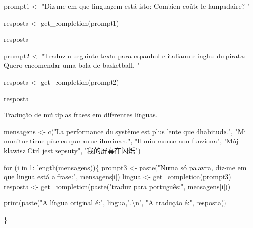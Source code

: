 \documentclass[
  letterpaper,
  paper=6in:9in,
  pagesize=pdftex,
  headinclude=on,
  footinclude=on,
  12pt]{scrbook}
\newenvironment{Shaded}{\begin{snugshade}}{\end{snugshade}}
\newcommand{\ControlFlowTok}[1]{\textcolor[rgb]{0.00,0.23,0.31}{#1}}
\newcommand{\DecValTok}[1]{\textcolor[rgb]{0.68,0.00,0.00}{#1}}
\newcommand{\FunctionTok}[1]{\textcolor[rgb]{0.28,0.35,0.67}{#1}}
\newcommand{\NormalTok}[1]{\textcolor[rgb]{0.00,0.23,0.31}{#1}}
\newcommand{\OtherTok}[1]{\textcolor[rgb]{0.00,0.23,0.31}{#1}}
\newcommand{\SpecialCharTok}[1]{\textcolor[rgb]{0.37,0.37,0.37}{#1}}
\newcommand{\StringTok}[1]{\textcolor[rgb]{0.13,0.47,0.30}{#1}}
\begin{document}
\begin{Shaded}
\begin{Highlighting}[]
\NormalTok{prompt1 }\OtherTok{\textless{}{-}} \StringTok{"Diz{-}me em que linguagem está isto: \textquotesingle{}Combien coûte le lampadaire?\textquotesingle{} "}

\NormalTok{resposta }\OtherTok{\textless{}{-}} \FunctionTok{get\_completion}\NormalTok{(prompt1)}

\NormalTok{resposta}
\end{Highlighting}
\end{Shaded}

\begin{Shaded}
\begin{Highlighting}[]
\NormalTok{prompt2 }\OtherTok{\textless{}{-}} \StringTok{"Traduz o seguinte texto para espanhol e }
\StringTok{italiano e ingles de pirata: \textquotesingle{}\textquotesingle{}\textquotesingle{}Quero encomendar uma bola de basketball.\textquotesingle{}\textquotesingle{}\textquotesingle{} "}

\NormalTok{resposta }\OtherTok{\textless{}{-}} \FunctionTok{get\_completion}\NormalTok{(prompt2)}

\NormalTok{resposta}
\end{Highlighting}
\end{Shaded}

Tradução de múltiplas frases em diferentes línguas.

\begin{Shaded}
\begin{Highlighting}[]
\NormalTok{mensagens }\OtherTok{\textless{}{-}} \FunctionTok{c}\NormalTok{(}\StringTok{"La performance du système est plus lente que d\textquotesingle{}habitude."}\NormalTok{,  }
               \StringTok{"Mi monitor tiene píxeles que no se iluminan."}\NormalTok{,}
               \StringTok{"Il mio mouse non funziona"}\NormalTok{,}
               \StringTok{"Mój klawisz Ctrl jest zepsuty"}\NormalTok{,}
               \StringTok{"我的屏幕在闪烁"}\NormalTok{)}

\ControlFlowTok{for}\NormalTok{ (i }\ControlFlowTok{in} \DecValTok{1}\SpecialCharTok{:} \FunctionTok{length}\NormalTok{(mensagens))\{}
\NormalTok{  prompt3 }\OtherTok{\textless{}{-}} \FunctionTok{paste}\NormalTok{(}\StringTok{"Numa só palavra, diz{-}me em que lingua está a frase:"}\NormalTok{, mensagens[i])}
\NormalTok{  lingua }\OtherTok{\textless{}{-}} \FunctionTok{get\_completion}\NormalTok{(prompt3)}
\NormalTok{  resposta }\OtherTok{\textless{}{-}} \FunctionTok{get\_completion}\NormalTok{(}\FunctionTok{paste}\NormalTok{(}\StringTok{"traduz para português:"}\NormalTok{, mensagens[i]))}
  
  \FunctionTok{print}\NormalTok{(}\FunctionTok{paste}\NormalTok{(}\StringTok{"A língua original é:"}\NormalTok{, lingua,}\StringTok{".}\SpecialCharTok{\textbackslash{}n}\StringTok{"}\NormalTok{,}
              \StringTok{"A tradução é:"}\NormalTok{, resposta))}
  
\NormalTok{\}}
\end{Highlighting}
\end{Shaded}
\end{document}
